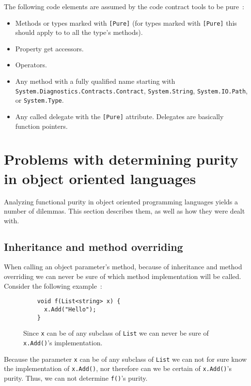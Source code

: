 \documentclass[a4paper,12pt]{article}
\begin{document}
The following code elements are assumed by the code contract tools to be pure~\cite{microsoft-code-contracts}: %

\begin{itemize}
  \item Methods or types marked with \texttt{[Pure]} (for types marked with \texttt{[Pure]} this should apply to to all the type's methods).
  \item Property get accessors.
  \item Operators.
  \item Any method with a fully qualified name starting with \texttt{System.Diagnost\-ics.Contracts.Contract}, \texttt{System.String}, \texttt{System\-.IO.Path}, or \texttt{System.Type}.
  \item Any called delegate with the \texttt{[Pure]} attribute. Delegates are basically function pointers.
\end{itemize}

\section{Problems with determining purity in object oriented languages} \label{sec:problems-with-purity-in-oo}

Analyzing functional purity in object oriented programming languages yields a number of dilemmas. This section describes them, as well as how they were dealt with.

\subsection{Inheritance and method overriding} \label{sub:inheritance}

When calling an object parameter's method, because of inheritance and method overriding we can never be sure of which method implementation will be called. Consider the following example~\cite{pearce2011jpure}:

\begin{figure}[H]
  \centering
  \begin{lstlisting}
    void f(List<string> x) {
      x.Add("Hello");
    }
  \end{lstlisting}
  \caption{Since \texttt{x} can be of any subclass of \texttt{List} we can never be sure of \texttt{x.Add()}'s implementation.}
  \label{fig:inheritance-example}
\end{figure}

Because the parameter \texttt{x} can be of any subclass of \texttt{List} we can not for sure know the implementation of \texttt{x.Add()}, nor therefore can we be certain of \texttt{x.Add()}'s purity. Thus, we can not determine \texttt{f()}'s purity.
\end{document}
